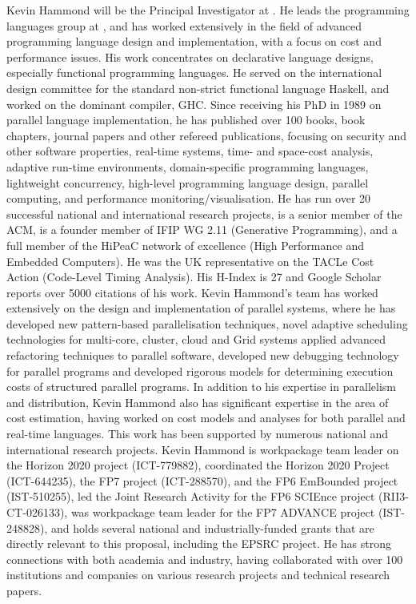 \documentclass[a4paper,11pt]{article}
\begin{document}
Kevin Hammond will be the Principal Investigator at \SAshort{}. He leads
the programming languages group at \SAshort{}, and has worked
extensively in the field of advanced programming language
design and implementation, with a focus on cost and performance
issues.  His work concentrates on declarative language designs,
especially functional programming languages.
He served on the international design committee for the standard
non-strict functional language Haskell,
and worked on the dominant compiler, GHC. Since receiving his
PhD in 1989 on parallel language implementation, he has published over 100 books, book chapters,
journal papers and other refereed publications,
focusing on security and other software properties,
real-time systems, time- and space-cost analysis,  adaptive run-time environments,
domain-specific programming languages,  lightweight
concurrency, high-level programming language design,  parallel computing, and
performance monitoring/visualisation.  
He has run over 20
successful national and international research projects,
is a senior member of the ACM,
is a founder member of IFIP WG 2.11 (Generative Programming),
and a full member of the HiPeaC network of excellence (High Performance and Embedded Computers).
He was the UK representative on the TACLe Cost Action (Code-Level Timing Analysis).
His H-Index is 27 and Google Scholar reports over 5000 citations of his work.
%
Kevin Hammond's team has worked extensively on the design and implementation
of parallel systems, where he has developed new pattern-based parallelisation techniques,
novel adaptive scheduling technologies for multi-core, 
cluster, cloud and Grid systems
applied advanced refactoring techniques to parallel software,
developed new debugging technology for parallel programs
and developed rigorous models for determining execution costs of structured parallel programs.
In addition to his expertise in parallelism and distribution, Kevin Hammond also has
significant expertise in the area of cost estimation, having worked on
cost models and analyses for both
parallel
and real-time languages. 
This work has been supported by numerous national and international
research projects.
Kevin Hammond is workpackage team leader on the Horizon 2020 \teamplay project (ICT-779882),
coordinated the Horizon 2020 Project \rephrase
(ICT-644235), the FP7 \paraphrase project (ICT-288570), and
the FP6 EmBounded project (IST-510255), led the Joint Research Activity
for the FP6 SCIEnce project (RII3-CT-026133), was workpackage team
leader for the FP7 ADVANCE project (IST-248828), and holds several national
and industrially-funded grants that are directly relevant to this
proposal, including the EPSRC \discovery project.  He has strong connections with both academia and industry,
having collaborated with over 100 institutions and companies on
various research projects and technical research papers.
\end{document}
